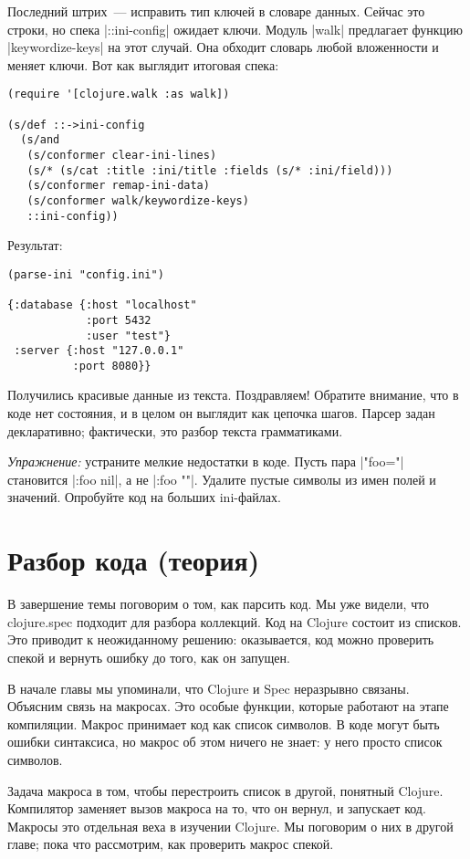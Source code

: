 Последний штрих~--- исправить тип ключей в словаре данных. Сейчас это строки, но
спека \spverb|::ini-config| ожидает ключи. Модуль \spverb|walk| предлагает
функцию \spverb|keywordize-keys| на этот случай. Она обходит словарь любой
вложенности и меняет ключи. Вот как выглядит итоговая спека:

\begin{verbatim}
(require '[clojure.walk :as walk])

(s/def ::->ini-config
  (s/and
   (s/conformer clear-ini-lines)
   (s/* (s/cat :title :ini/title :fields (s/* :ini/field)))
   (s/conformer remap-ini-data)
   (s/conformer walk/keywordize-keys)
   ::ini-config))
\end{verbatim}

\noindent
Результат:

\begin{verbatim}
(parse-ini "config.ini")

{:database {:host "localhost"
            :port 5432
            :user "test"}
 :server {:host "127.0.0.1"
          :port 8080}}
\end{verbatim}

Получились красивые данные из текста. Поздравляем! Обратите внимание, что в коде
нет состояния, и в целом он выглядит как цепочка шагов. Парсер задан
декларативно; фактически, это разбор текста грамматиками.

\emph{Упражнение:} устраните мелкие недостатки в коде. Пусть пара
\spverb|"foo="| становится \spverb|{:foo nil}|, а не \spverb|{:foo ""}|.
Удалите пустые символы из имен полей и значений. Опробуйте код на больших
ini-файлах.

\section{Разбор кода (теория)}

В завершение темы поговорим о том, как парсить код. Мы уже видели, что
clojure.spec подходит для разбора коллекций. Код на Clojure состоит из
списков. Это приводит к неожиданному решению: оказывается, код можно проверить
спекой и вернуть ошибку до того, как он запущен.

В начале главы мы упоминали, что Clojure и Spec неразрывно связаны. Объясним
связь на макросах. Это особые функции, которые работают на этапе
компиляции. Макрос принимает код как список символов. В коде могут быть ошибки
синтаксиса, но макрос об этом ничего не знает: у него просто список символов.

Задача макроса в том, чтобы перестроить список в другой, понятный
Clojure. Компилятор заменяет вызов макроса на то, что он вернул, и запускает
код. Макросы это отдельная веха в изучении Clojure. Мы поговорим о них в другой
главе; пока что рассмотрим, как проверить макрос спекой.

